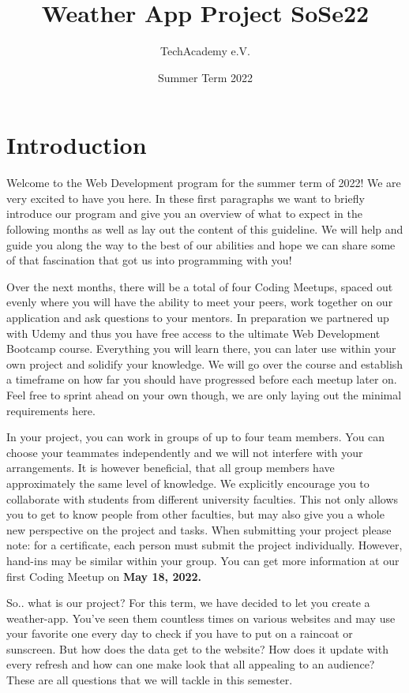 \documentclass[
]{article}
\title{Weather App Project SoSe22}
\author{TechAcademy e.V.}
\date{Summer Term 2022}
\begin{document}
\maketitle

{
\setcounter{tocdepth}{2}
\tableofcontents
}
\hypertarget{introduction}{%
\section{Introduction}\label{introduction}}

Welcome to the Web Development program for the summer term of 2022! We are very excited to have you here. In these first paragraphs we want to briefly introduce our program and give you an overview of what to expect in the following months as well as lay out the content of this guideline. We will help and guide you along the way to the best of our abilities and hope we can share some of that fascination that got us into programming with you!

Over the next months, there will be a total of four Coding Meetups, spaced out evenly where you will have the ability to meet your peers, work together on our application and ask questions to your mentors. In preparation we partnered up with Udemy and thus you have free access to the ultimate Web Development Bootcamp course. Everything you will learn there, you can later use within your own project and solidify your knowledge. We will go over the course and establish a timeframe on how far you should have progressed before each meetup later on. Feel free to sprint ahead on your own though, we are only laying out the minimal requirements here.

In your project, you can work in groups of up to four team members. You can choose your teammates independently and we will not interfere with your arrangements. It is however beneficial, that all group members have approximately the same level of knowledge. We explicitly encourage you to collaborate with students from different university faculties. This not only allows you to get to know people from other faculties, but may also give you a whole new perspective on the project and tasks. When submitting your project please note: for a certificate, each person must submit the project individually. However, hand-ins may be similar within your group. You can get more information at our first Coding Meetup on \textbf{May 18, 2022.}

So.. what is our project? For this term, we have decided to let you create a weather-app. You've seen them countless times on various websites and may use your favorite one every day to check if you have to put on a raincoat or sunscreen. But how does the data get to the website? How does it update with every refresh and how can one make look that all appealing to an audience? These are all questions that we will tackle in this semester.
\end{document}
